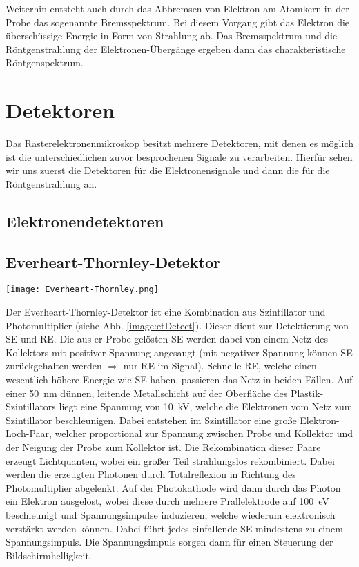 Weiterhin entsteht auch durch das Abbremsen von Elektron am Atomkern in der Probe das sogenannte Bremsspektrum. Bei diesem Vorgang gibt das Elektron die überschüssige Energie in Form von Strahlung ab. Das Bremsspektrum und die Röntgenstrahlung der Elektronen-Übergänge ergeben dann das charakteristische Röntgenspektrum.
\newpage
\section{Detektoren}
\label{sec:detect}
Das Rasterelektronenmikroskop besitzt mehrere Detektoren, mit denen es möglich ist die unterschiedlichen zuvor besprochenen Signale zu verarbeiten. Hierfür sehen wir uns zuerst die Detektoren für die Elektronensignale und dann die für die Röntgenstrahlung an.  
\subsection{Elektronendetektoren}
\subsection*{Everheart-Thornley-Detektor}
\label{sub:etDetect}
\begin{center}
    \texttt{[image: Everheart-Thornley.png]}
    \label{image:etDetect}
\end{center}
Der Everheart-Thornley-Detektor ist eine Kombination aus Szintillator und Photomultiplier (siehe Abb. \ref{image:etDetect}). Dieser dient zur Detektierung von SE und RE. Die aus er Probe gelösten SE werden dabei von einem Netz des Kollektors mit positiver Spannung angesaugt (mit negativer Spannung können SE zurückgehalten werden $\Rightarrow$ nur RE im Signal). Schnelle RE, welche einen wesentlich höhere Energie wie SE haben, passieren das Netz in beiden Fällen. Auf einer \SI{50}{\nano\metre} dünnen, leitende Metallschicht auf der Oberfläche des Plastik-Szintillators liegt eine Spannung von \SI{10} {\kilo\volt}, welche die Elektronen vom Netz zum Szintillator beschleunigen. Dabei entstehen im Szintillator eine große Elektron-Loch-Paar, welcher proportional zur Spannung zwischen Probe und Kollektor und der Neigung der Probe zum Kollektor ist. Die Rekombination dieser Paare erzeugt Lichtquanten, wobei ein großer Teil strahlungslos rekombiniert. Dabei werden die erzeugten Photonen durch Totalreflexion in Richtung des Photomultiplier abgelenkt. Auf der Photokathode wird dann durch das Photon ein Elektron ausgelöst, wobei diese durch mehrere Prallelektrode auf \SI{100}{\electronvolt} beschleunigt und Spannungsimpulse induzieren, welche wiederum elektronisch verstärkt werden können. Dabei führt jedes einfallende SE mindestens zu einem Spannungsimpuls. Die Spannungsimpuls sorgen dann für einen Steuerung der Bildschirmhelligkeit.
\newpage
